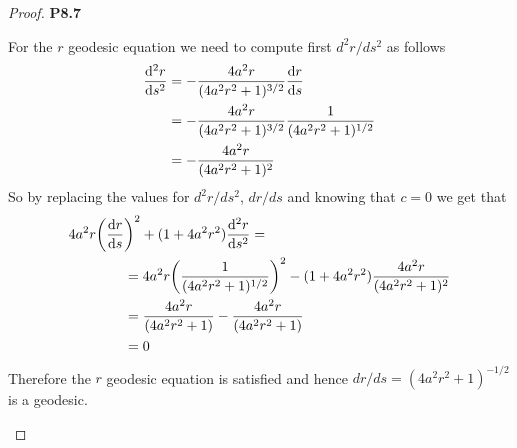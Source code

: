 \documentclass[11pt]{article}
\theoremstyle{definition}
\begin{document}
\begin{proof}{\textbf{P8.7}}
\begin{itemize}
        For the $r$ geodesic equation we need to compute first $d^2r/ds^2$
        as follows
        \begin{align*}
            \derivative[2]{r}{s}
            &= -\frac{4a^2r}{(4a^2r^2 + 1)^{3/2}}\derivative{r}{s}\\
            &= -\frac{4a^2r}{(4a^2r^2 + 1)^{3/2}}\frac{1}{(4a^2r^2 + 1)^{1/2}}\\
            &= -\frac{4a^2r}{(4a^2r^2 + 1)^{2}}
        \end{align*}
        So by replacing the values for $d^2r/ds^2$, $dr/ds$ and knowing that
        $c = 0$ we get that
        \begin{align*}
            4a^2r\bigg(\derivative{r}{s}&\bigg)^2 +
            (1 + 4a^2r^2)\derivative[2]{r}{s} =\\
            &= 4a^2r\bigg(\frac{1}{(4a^2r^2 + 1)^{1/2}}\bigg)^2 -
            (1 + 4a^2r^2)\frac{4a^2r}{(4a^2r^2 + 1)^{2}}\\
            &= \frac{4a^2r}{(4a^2r^2 + 1)} -
            \frac{4a^2r}{(4a^2r^2 + 1)}\\
            &= 0
        \end{align*}
        Therefore the $r$ geodesic equation is satisfied and hence
        $dr/ds = (4a^2r^2 + 1)^{-1/2}$ is a geodesic.
    \end{itemize}
\end{proof}
    
\end{document}
